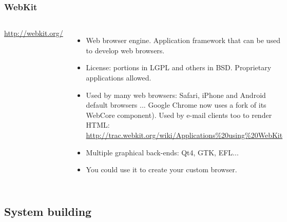 \begin{frame}
  \frametitle{WebKit}
  \begin{columns}[T]
    \url{http://webkit.org/}
    \begin{itemize}
    \item Web browser engine. Application framework that can be used
      to develop web browsers.
    \item License: portions in LGPL and others in BSD. Proprietary
      applications allowed.
    \item Used by many web browsers: Safari, iPhone and Android default
      browsers ... Google Chrome now uses a fork of its WebCore component).
      Used by e-mail clients too to render HTML:
      \url{http://trac.webkit.org/wiki/Applications\%20using\%20WebKit}
    \item Multiple graphical back-ends: Qt4, GTK, EFL...
    \item You could use it to create your custom browser.
    \end{itemize}
    \includegraphics[width=\textwidth]{slides/sysdev-embedded-linux/webkit.png}
  \end{columns}
\end{frame}

\subsection{System building}

